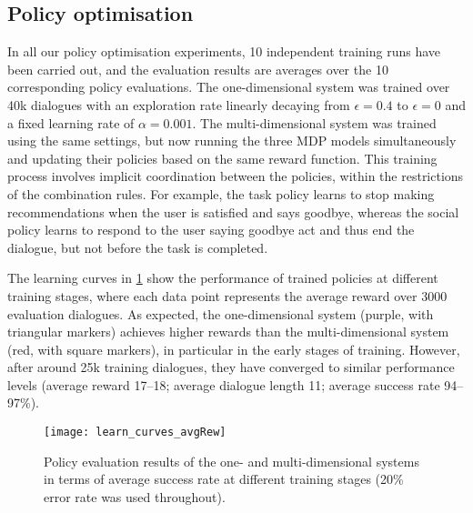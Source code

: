 \documentclass[11pt]{article}
\begin{document}
\subsection{Policy optimisation}

In all our policy optimisation experiments, 10 independent training runs have been carried out, and the evaluation results are averages over the 10 corresponding policy evaluations.  The one-dimensional system was trained over 40k dialogues with an exploration rate linearly decaying from $\epsilon=0.4$ to $\epsilon=0$ and a fixed learning rate of $\alpha=0.001$.  The multi-dimensional system was trained using the same settings, but now running the three MDP models simultaneously and updating their policies based on the same reward function.  This training process involves implicit coordination between the policies, within the restrictions of the combination rules.  For example, the task policy learns to stop making recommendations when the user is satisfied and says goodbye, whereas the social policy learns to respond to the user saying goodbye act and thus end the dialogue, but not before the task is completed.

The learning curves in \cref{fig:curves} show the performance of trained policies at different training stages, where each data point represents the average reward over 3000 evaluation dialogues.  As expected, the one-dimensional system (purple, with triangular markers) achieves higher rewards than the multi-dimensional system (red, with square markers), in particular in the early stages of training.  However, after around 25k training dialogues, they have converged to similar performance levels (average reward 17--18; average dialogue length 11; average success rate 94--97\%).
\begin{figure}[htb]
\centering
\texttt{[image: learn\_curves\_avgRew]}
\caption{Policy evaluation results of the one- and multi-dimensional systems in terms of average success rate at different training stages (20\% error rate was used throughout).}
\label{fig:curves}
\end{figure}
\end{document}
